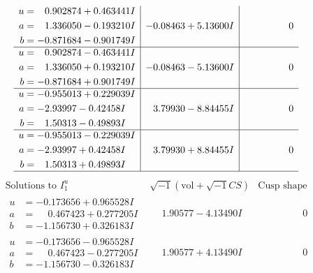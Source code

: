 \documentclass[1p]{elsarticle_modified}
\theoremstyle{definition}
\newcommand{\I}{\sqrt{-1}}
\begin{document}
$$\begin{array}{c|c|c}
\begin{aligned}
u &= \phantom{-}0.902874 + 0.463441 I \\
a &= \phantom{-}1.336050 - 0.193210 I \\
b &= -0.871684 - 0.901749 I\end{aligned}
 & -0.08463 + 5.13600 I & \phantom{-0.000000 } 0 \\ \hline\begin{aligned}
u &= \phantom{-}0.902874 - 0.463441 I \\
a &= \phantom{-}1.336050 + 0.193210 I \\
b &= -0.871684 + 0.901749 I\end{aligned}
 & -0.08463 - 5.13600 I & \phantom{-0.000000 } 0 \\ \hline\begin{aligned}
u &= -0.955013 + 0.229039 I \\
a &= -2.93997 - 0.42458 I \\
b &= \phantom{-}1.50313 - 0.49893 I\end{aligned}
 & \phantom{-}3.79930 - 8.84455 I & \phantom{-0.000000 } 0 \\ \hline\begin{aligned}
u &= -0.955013 - 0.229039 I \\
a &= -2.93997 + 0.42458 I \\
b &= \phantom{-}1.50313 + 0.49893 I\end{aligned}
 & \phantom{-}3.79930 + 8.84455 I & \phantom{-0.000000 } 0\\
 \hline 
 \end{array}$$\newpage$$\begin{array}{c|c|c}  
\text{Solutions to }I^u_{1}& \I (\text{vol} + \sqrt{-1}CS) & \text{Cusp shape}\\
 \hline 
\begin{aligned}
u &= -0.173656 + 0.965528 I \\
a &= \phantom{-}0.467423 + 0.277205 I \\
b &= -1.156730 + 0.326183 I\end{aligned}
 & \phantom{-}1.90577 - 4.13490 I & \phantom{-0.000000 } 0 \\ \hline\begin{aligned}
u &= -0.173656 - 0.965528 I \\
a &= \phantom{-}0.467423 - 0.277205 I \\
b &= -1.156730 - 0.326183 I\end{aligned}
 & \phantom{-}1.90577 + 4.13490 I & \phantom{-0.000000 } 0 \\ \hline\begin{aligned}

\end{aligned}
\end{array}$$
\end{document}
